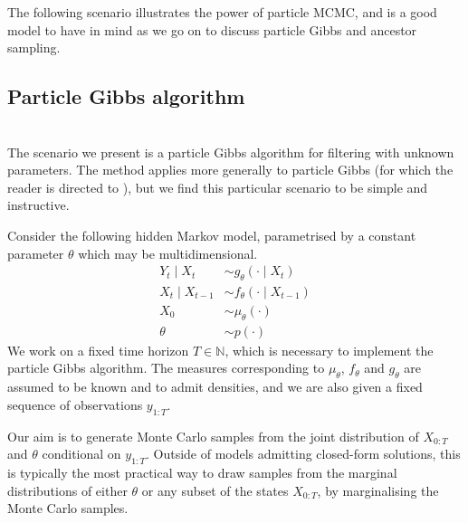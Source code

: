 The following scenario illustrates the power of particle MCMC, and is a good model to have in mind as we go on to discuss particle Gibbs and ancestor sampling.


\subsection{Particle Gibbs algorithm \seb{$\sim$} }
\\

The scenario we present is a particle Gibbs algorithm for filtering with unknown parameters. The method applies more generally to particle Gibbs (for which the reader is directed to \textcite[Chapter 5]{lindsten2013}), but we find this particular scenario to be simple and instructive. 

Consider the following hidden Markov model, parametrised by a constant parameter $\theta$ which may be multidimensional.
\begin{align*}
Y_t \mid X_t &\sim g_\theta(\cdot \mid X_t)\\
X_{t} \mid X_{t-1} &\sim f_\theta(\cdot \mid X_{t-1})\\
X_0 &\sim \mu_\theta(\cdot) \\
\theta &\sim p(\cdot)
\end{align*}
We work on a fixed time horizon $T \in \mathbb{N}$, which is necessary to implement the particle Gibbs algorithm.
The measures corresponding to $\mu_\theta$, $f_\theta$ and $g_\theta$ are assumed to be known and to admit densities, and we are also given a fixed sequence of observations $y_{1:T}$. 

Our aim is to generate Monte Carlo samples from the joint distribution of $X_{0:T}$ and $\theta$ conditional on $y_{1:T}$. Outside of models admitting closed-form solutions, this is typically the most practical way to draw samples from the marginal distributions of either $\theta$ or any subset of the states $X_{0:T}$, by marginalising the Monte Carlo samples. 

